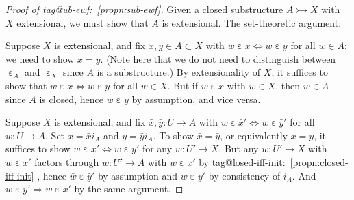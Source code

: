 \documentclass{amsart}
\makeatletter
\newcommand\ein{\mathrel{\varepsilon}}
\newcommand\ToT{\Leftrightarrow}
\newcommand\To{\Rightarrow}
\newcommand\tto{\rightarrowtail}
\newcommand\unein{{\ein}}
\newcommand\tagword[1]{\csname tag@#1\endcsname}
\def\label@tag#1:#2\@nil{#1}
\newcommand\labeltag[1]{\label@tag#1:\@nil}
\newcommand\jref[1]{%
  \texorpdfstring%
    {\hyperref[#1]{\tagword{\labeltag{#1}}~\ref*{#1}}}%
    {\tagword{\labeltag{#1}}~\ref*{#1}}%
}
\theoremstyle{definition}
\theoremstyle{remark}
\theoremstyle{plainwithref}
\newenvironment{settybox}{\begin{tcolorbox}[colback=blue!20,breakable%
    ,enhanced%
    ,sharp corners%
    ,frame hidden%
    ,boxsep=0pt
    ,left=5pt,right=5pt,top=5pt,bottom=5pt
    ,enlarge left by=-5pt,width=\linewidth+10pt
    ,enlarge top by=5pt,enlarge bottom by=5pt
    ,before skip balanced=0pt,after skip balanced=0pt
    ]}{\end{tcolorbox}}
\makeatother
\begin{document}
\begin{proof}[Proof of \jref{propn:sub-ewf}] \label{proof:sub-ewf}
  Given a closed substructure \( A \tto X \) with \( X \) extensional, we must show that \( A \) is extensional.
  The set-theoretic argument:
  \begin{settybox}
    Suppose \( X \) is extensional, and fix \( x,y \in A \subset X \) with \( w \ein x \ToT w \ein y \) for all \( w \in A \); we need to show \( x = y \).
    (Note here that we do not need to distinguish between \( \unein_A \) and \( \unein_X \) since \( A \) is a substructure.)
    By extensionality of \( X \), it suffices to show that \( w \ein x \ToT w \ein y \) for all \( w \in X \).
    But if \( w \ein x \) with \( w \in X \), then \( w \in A \) since \( A \) is closed, hence \( w \ein y \) by assumption, and vice versa.
  \end{settybox}

  Suppose \( X \) is extensional, and fix \( \bar x, \bar y \colon U \to A \) with \( w \ein \bar x' \ToT w \ein \bar y' \) for all \( w \colon U \to A \).
  Set \( x = \bar x i_A \) and \( y = \bar y i_A \).
  To show \( \bar x = \bar y \), or equivalently \( x = y \), it suffices to show \( w \ein x' \ToT w \ein y' \) for any \( w \colon U' \to X \).
  But any \( w \colon U' \to X \) with \( w \ein x' \) factors through \( \bar w \colon U' \to A \) with \( \bar w \ein \bar x' \) by \jref{propn:closed-iff-init}, hence \( \bar w \ein \bar y' \) by assumption and \( w \ein y' \) by consistency of \( i_A \).
  And \( w \ein y' \To w \ein x' \) by the same argument.
\end{proof}
\end{document}
